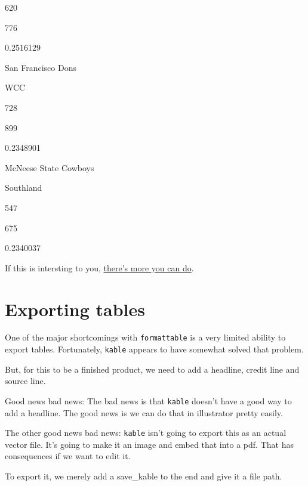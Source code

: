 \documentclass[
]{book}
\begin{document}
620

776

0.2516129


San Francisco Dons

WCC

728

899

0.2348901


McNeese State Cowboys

Southland

547

675

0.2340037


If this is intersting to you, \href{https://cran.r-project.org/web/packages/kableExtra/vignettes/awesome_table_in_html.html\#overview}{there's more you can do}.

\hypertarget{exporting-tables}{%
\section{Exporting tables}\label{exporting-tables}}

One of the major shortcomings with \texttt{formattable} is a very limited ability to export tables. Fortunately, \texttt{kable} appears to have somewhat solved that problem.

But, for this to be a finished product, we need to add a headline, credit line and source line.

Good news bad news: The bad news is that \texttt{kable} doesn't have a good way to add a headline. The good news is we can do that in illustrator pretty easily.

The other good news bad news: \texttt{kable} isn't going to export this as an actual vector file. It's going to make it an image and embed that into a pdf. That has consequences if we want to edit it.

To export it, we merely add a save\_kable to the end and give it a file path.
\end{document}

